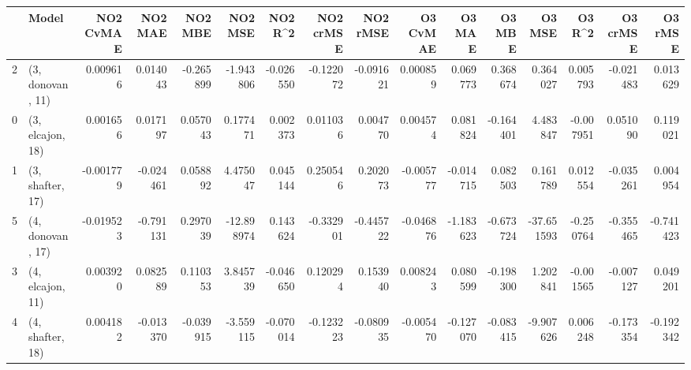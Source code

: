 \begin{tabular}{llrrrrrrrrrrrrrr}
\toprule
{} &             Model &  NO2 CvMAE &   NO2 MAE &   NO2 MBE &    NO2 MSE &   NO2 R\textasciicircum2 &  NO2 crMSE &  NO2 rMSE &  O3 CvMAE &    O3 MAE &    O3 MBE &     O3 MSE &    O3 R\textasciicircum2 &  O3 crMSE &   O3 rMSE \\
\midrule
2 &  (3, donovan, 11) &   0.009616 &  0.014043 & -0.265899 &  -1.943806 & -0.026550 &  -0.122072 & -0.091621 &  0.000859 &  0.069773 &  0.368674 &   0.364027 &  0.005793 & -0.021483 &  0.013629 \\
0 &  (3, elcajon, 18) &   0.001656 &  0.017197 &  0.057043 &   0.177471 &  0.002373 &   0.011036 &  0.004770 &  0.004574 &  0.081824 & -0.164401 &   4.483847 & -0.007951 &  0.051090 &  0.119021 \\
1 &  (3, shafter, 17) &  -0.001779 & -0.024461 &  0.058892 &   4.475047 &  0.045144 &   0.250546 &  0.202073 & -0.005777 & -0.014715 &  0.082503 &   0.161789 &  0.012554 & -0.035261 &  0.004954 \\
5 &  (4, donovan, 17) &  -0.019523 & -0.791131 &  0.297039 & -12.898974 &  0.143624 &  -0.332901 & -0.445722 & -0.046876 & -1.183623 & -0.673724 & -37.651593 & -0.250764 & -0.355465 & -0.741423 \\
3 &  (4, elcajon, 11) &   0.003920 &  0.082589 &  0.110353 &   3.845739 & -0.046650 &   0.120294 &  0.153940 &  0.008243 &  0.080599 & -0.198300 &   1.202841 & -0.001565 & -0.007127 &  0.049201 \\
4 &  (4, shafter, 18) &   0.004182 & -0.013370 & -0.039915 &  -3.559115 & -0.070014 &  -0.123223 & -0.080935 & -0.005470 & -0.127070 & -0.083415 &  -9.907626 &  0.006248 & -0.173354 & -0.192342 \\
\bottomrule
\end{tabular}
